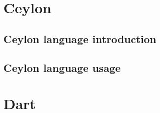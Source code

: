 \documentclass{abnt}
\begin{document}
\chapter{Ceylon}

\section{Ceylon language introduction}



\section{Ceylon language usage}



\chapter{Dart}


\end{document}
